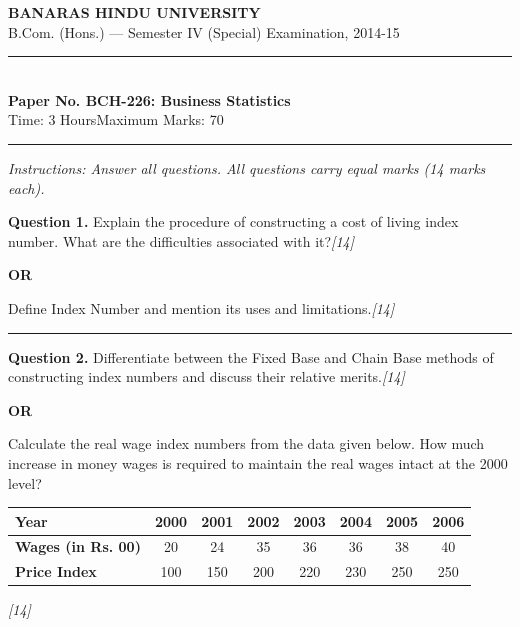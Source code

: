 \documentclass[11pt,a4paper]{article}
\newcommand{\pts}[1]{\hfill   \textit{[#1]}}
\begin{document}
\begin{center}
  {\large\bfseries BANARAS HINDU UNIVERSITY}\\[2pt]
  {\normalsize B.Com. (Hons.) --- Semester IV (Special) Examination, 2014-15}\\[6pt]
  \rule{0.8\linewidth}{0.5pt}\\[6pt]
  {\large\bfseries Paper No. BCH-226: Business Statistics}\\[4pt]
  {\normalsize Time: 3 Hours\hfill Maximum Marks: 70}
\end{center}

\rule{\linewidth}{0.4pt}

\smallskip



\noindent   \textit{Instructions: Answer all questions. All questions carry equal marks (14 marks each).}

\bigskip




\noindent   \textbf{Question 1.}
Explain the procedure of constructing a cost of living index number. What are the difficulties associated with it?\pts{14}

\centerline{   \textbf{OR}}

Define Index Number and mention its uses and limitations.\pts{14}

\medskip\rule{\linewidth}{0.2pt}




\noindent   \textbf{Question 2.}
Differentiate between the Fixed Base and Chain Base methods of constructing index numbers and discuss their relative merits.\pts{14}

\centerline{   \textbf{OR}}

Calculate the real wage index numbers from the data given below. How much increase in money wages is required to maintain the real wages intact at the 2000 level?


\begin{center}
\small

\begin{tabular}{|l|c|c|c|c|c|c|c|}
\hline
   \textbf{Year} & 2000 & 2001 & 2002 & 2003 & 2004 & 2005 & 2006 \\
\hline
   \textbf{Wages (in Rs. 00)} & 20 & 24 & 35 & 36 & 36 & 38 & 40 \\
\hline
   \textbf{Price Index} & 100 & 150 & 200 & 220 & 230 & 250 & 250 \\
\hline
\end{tabular}
\end{center}\pts{14}
\end{document}

